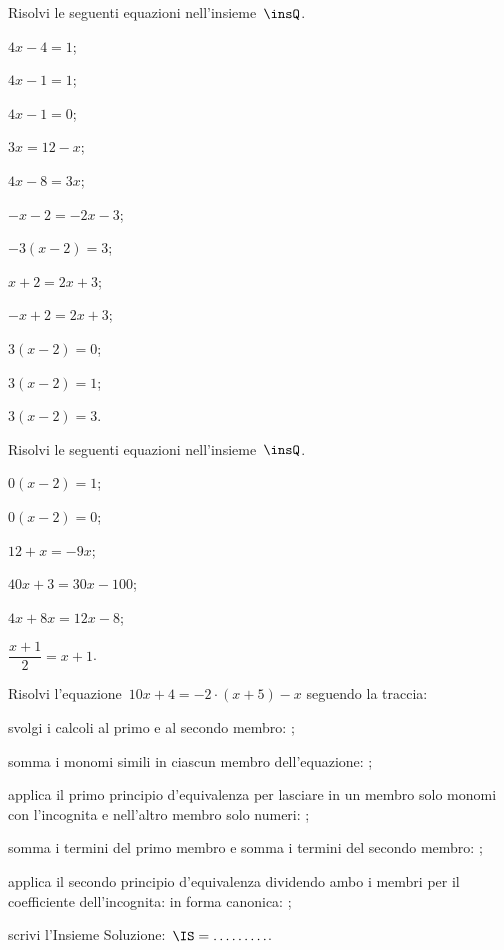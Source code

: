 \begin{esercizio}
\label{ese:15.11}
Risolvi le seguenti equazioni nell'insieme~$\insQ$.
\begin{multicols}{3}
\begin{enumeratea}
 \item $4x-4=1$;
 \item $4x-1=1$;
 \item $4x-1=0$;
 \item $3x=12-x$;
 \item $4x-8=3x$;
 \item $-x-2=-2x-3$;
 \item $-3(x-2)=3$;
 \item $x+2=2x+3$;
 \item $-x+2=2x+3$;
 \item $3(x-2)=0$;
 \item $3(x-2)=1$;
 \item $3(x-2)=3$.
\end{enumeratea}
\end{multicols}
\end{esercizio}

\begin{esercizio}[\Ast]
\label{ese:15.12}
Risolvi le seguenti equazioni nell'insieme~$\insQ$.
\begin{multicols}{3}
\begin{enumeratea}
 \item $0(x-2)=1$;
 \item $0(x-2)=0$;
 \item $12+x=-9x$;
 \item $40x+3=30x-100$;
 \item $4x+8x=12x-8$;
 \item $\dfrac{x+1}{2}=x+1$.
\end{enumeratea}
\end{multicols}
\end{esercizio}

\pagebreak

\begin{esercizio}
\label{ese:15.13}
Risolvi l'equazione~$10x+4=-2\cdot (x+5)-x$ seguendo la traccia:
\begin{enumeratea}
 \item svolgi i calcoli al primo e al secondo membro: \dotfill;
 \item somma i monomi simili in ciascun membro dell'equazione: \dotfill;
 \item applica il primo principio d'equivalenza per lasciare in un membro solo monomi con l'incognita e nell'altro membro solo numeri: \dotfill;
 \item somma i termini del primo membro e somma i termini del secondo membro: \dotfill;
 \item applica il secondo principio d'equivalenza dividendo ambo i membri per il coefficiente dell'incognita: \dotfill in forma canonica: \dotfill;
 \item scrivi l'Insieme Soluzione:~$\IS = \ldots \ldots \ldots$.
\end{enumeratea}
\end{esercizio}


